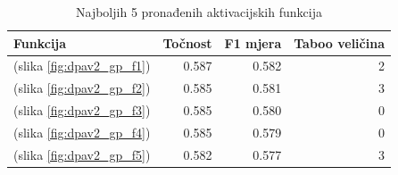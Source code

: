 \documentclass[times, utf8, numeric, diplomski]{fer}
\def\figref#1{(slika \ref{#1})}
\begin{document}
\begin{table}[H]
\begin{tabular}{lrrr}
Funkcija & Točnost & F1 mjera & Taboo veličina \\
\hline
\figref{fig:dpav2_gp_f1} & 0.587 & 0.582 & 2 \\
\figref{fig:dpav2_gp_f2} & 0.585 & 0.581 & 3 \\
\figref{fig:dpav2_gp_f3} & 0.585 & 0.580 & 0 \\
\figref{fig:dpav2_gp_f4} & 0.585 & 0.579 & 0 \\
\figref{fig:dpav2_gp_f5} & 0.582 & 0.577 & 3 \\
\end{tabular}
\centering
\caption{Najboljih 5 pronađenih aktivacijskih funkcija}
\label{tab:dpav2_top5}
\end{table}
\end{document}
